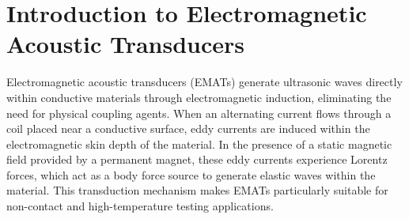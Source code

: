 \thesistranslationoriginal
\section{Introduction to Electromagnetic Acoustic Transducers}

Electromagnetic acoustic transducers (EMATs) generate ultrasonic waves directly within conductive materials through electromagnetic induction, eliminating the need for physical coupling agents. When an alternating current flows through a coil placed near a conductive surface, eddy currents are induced within the electromagnetic skin depth of the material. In the presence of a static magnetic field provided by a permanent magnet, these eddy currents experience Lorentz forces, which act as a body force source to generate elastic waves within the material. This transduction mechanism makes EMATs particularly suitable for non-contact and high-temperature testing applications.